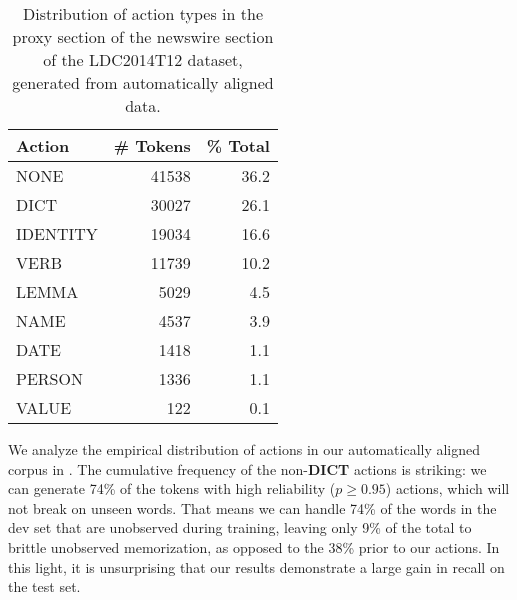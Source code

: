 \documentclass[11pt]{article}
\newcommand\w[1]{\textit{#1}} %
\begin{document}
\begin{table}[t]
\begin{center}
\begin{tabular}{l|rr}
\bf Action & \bf \# Tokens & \bf \% Total \\ \hline
NONE & 41538 & 36.2 \\
DICT & 30027 & 26.1 \\
IDENTITY & 19034 & 16.6 \\
VERB & 11739 & 10.2 \\
LEMMA & 5029 & 4.5 \\
NAME & 4537 & 3.9 \\
DATE & 1418 & 1.1 \\
PERSON & 1336 & 1.1 \\
VALUE & 122  & 0.1\\
\end{tabular}
\end{center}
\caption{\label{tab:distro} Distribution of action types in the proxy section of the newswire section of the LDC2014T12 dataset, generated from automatically aligned data. }
\end{table}

We analyze the empirical distribution of actions in our automatically aligned corpus in .
The cumulative frequency of the non-\textbf{DICT} actions is striking: we can generate 74\% of the tokens with high reliability ($p \geq 0.95$) actions, which will not break on unseen words.
That means we can handle 74\% of the words in the dev set that are unobserved during training, leaving only 9\% of the total to brittle unobserved memorization, as opposed to the 38\% prior to our actions.
In this light, it is unsurprising that our results demonstrate a large gain in recall on the test set.




\end{document}
